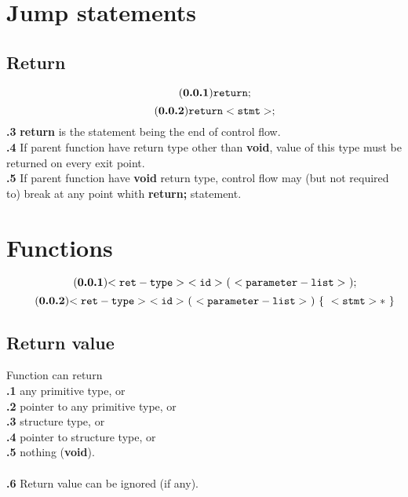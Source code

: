 \documentclass[leqno]{article}
\begin{document}
    \section{Jump statements}
        \subsection{Return}
            \begin{equation} \tag{\textbf{\thesubsection.1}}
                \tt{return;}
            \end{equation}
            \begin{equation} \tag{\textbf{\thesubsection.2}}
                \tt{return <stmt>;}
            \end{equation}
            \textbf{\thesubsection.3} \textbf{return} is the statement being the end of control flow. \\
            \textbf{\thesubsection.4} If parent function have return type other than
            \textbf{void}, value of this type must be returned on every exit point. \\
            \textbf{\thesubsection.5} If parent function have \textbf{void} return type,
            control flow may (but not required to) break at any point whith \textbf{return;}
            statement.
    
    \section{Functions}
        \begin{equation} \tag{\textbf{\thesubsection.1}}
            \tt{<ret-type>}\ \tt{<id>}\ \tt{(}\ \tt{<parameter-list>}\ \tt{);}
        \end{equation}
        \begin{equation} \tag{\textbf{\thesubsection.2}}
            \tt{<ret-type>}\ \tt{<id>}\ \tt{(}\ \tt{<parameter-list>}\ \tt{)}\ \tt{\{}\ <stmt>*\ \tt{\}}
        \end{equation}

        \subsection{Return value}
            Function can return \\
            \textbf{\thesubsection.1} any primitive type, or \\
            \textbf{\thesubsection.2} pointer to any primitive type, or \\
            \textbf{\thesubsection.3} structure type, or \\
            \textbf{\thesubsection.4} pointer to structure type, or \\
            \textbf{\thesubsection.5} nothing (\textbf{void}).\\
            \\
            \textbf{\thesubsection.6} Return value can be ignored (if any).
        
\end{document}
